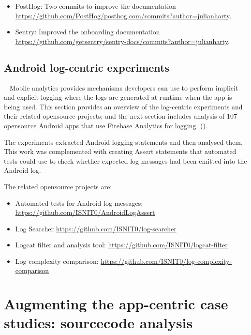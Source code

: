 \begin{itemize}
    \itemsep0em
    \item PostHog: Two commits to improve the documentation \url{https://github.com/PostHog/posthog.com/commits?author=julianharty}.
    \item Sentry: Improved the onboarding documentation \url{https://github.com/getsentry/sentry-docs/commits?author=julianharty}.
\end{itemize}


\subsection{Android log-centric experiments}~\label{section-android-log-centric-experiments}
Mobile analytics provides mechanisms developers can use to perform implicit and explicit logging where the logs are generated at runtime when the app is being used. This section provides an overview of the log-centric experiments and their related opensource projects; and the next section includes analysis of 107 opensource Android apps that use Firebase Analytics for logging. (). 

The experiments extracted Android logging statements and then analysed them. This work was complemented with creating Assert statements that automated tests could use to check whether expected log messages had been emitted into the Android log.

The related opensource projects are:
\begin{itemize}
    \itemsep0em
    \item Automated tests for Android log messages: \url{https://github.com/ISNIT0/AndroidLogAssert}
    \item Log Searcher \url{https://github.com/ISNIT0/log-searcher}
    \item Logcat filter and analysis tool: \url{https://github.com/ISNIT0/logcat-filter}
    \item Log complexity comparison: \url{https://github.com/ISNIT0/log-complexity-comparison}
\end{itemize}

\clearpage

\section{Augmenting the app-centric case studies: sourcecode analysis}~\label{section-sourcecode-analysis-to-augment-app-centric-case-studies}


